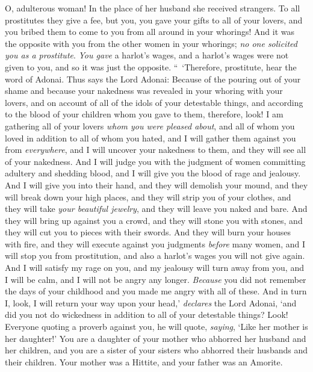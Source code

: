 \begin{biblechapter}
\verse O, adulterous woman! In the place of her husband she received strangers.
\verse To all prostitutes they give a fee, but you, you gave your gifts to all of your lovers, and you bribed them to come to you from all around in your whorings!
\verse And it was the opposite with you from the other women in your whorings; \textit{no one solicited you as a prostitute}. \textit{You gave} a harlot’s wages, and a harlot’s wages were not given to you, and so it was just the opposite.
\verse “ ‘Therefore, prostitute, hear the word of Adonai.
\verse Thus says the Lord Adonai: Because of the pouring out of your shame and because your nakedness was revealed in your whoring with your lovers, and on account of all of the idols of your detestable things, and according to the blood of your children whom you gave to them,
\verse therefore, look! I am gathering all of your lovers \textit{whom you were pleased about}, and all of whom you loved in addition to all of whom you hated, and I will gather them against you from \textit{everywhere}, and I will uncover your nakedness to them, and they will see all of your nakedness.
\verse And I will judge you with the judgment of women committing adultery and shedding blood, and I will give you the blood of rage and jealousy.
\verse And I will give you into their hand, and they will demolish your mound, and they will break down your high places, and they will strip you of your clothes, and they will take \textit{your beautiful jewelry}, and they will leave you naked and bare.
\verse And they will bring up against you a crowd, and they will stone you with stones, and they will cut you to pieces with their swords.
\verse And they will burn your houses with fire, and they will execute against you judgments \textit{before} many women, and I will stop you from prostitution, and also a harlot’s wages you will not give again.
\verse And I will satisfy my rage on you, and my jealousy will turn away from you, and I will be calm, and I will not be angry any longer.
\verse \textit{Because} you did not remember the days of your childhood and you made me angry with all of these. And in turn I, look, I will return your way upon your head,’ \textit{declares} the Lord Adonai, ‘and did you not do wickedness in addition to all of your detestable things?
\verse Look! Everyone quoting a proverb against you, he will quote, \textit{saying}, ‘Like her mother is her daughter!’
\verse You are a daughter of your mother who abhorred her husband and her children, and you are a sister of your sisters who abhorred their husbands and their children. Your mother was a Hittite, and your father was an Amorite.

\end{biblechapter}
